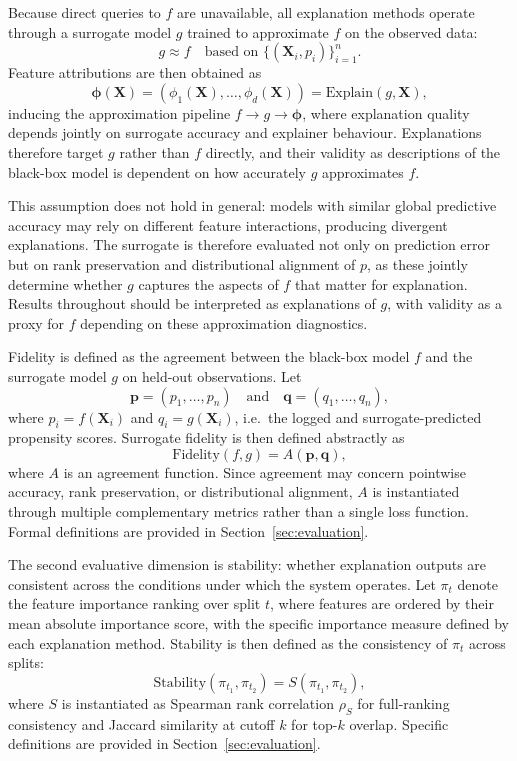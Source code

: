 \documentclass[oneside]{memoir} %
\begin{document}
Because direct queries to $f$ are unavailable, all explanation methods operate through a surrogate model $g$ trained to approximate $f$ on the observed data:
\[
g \approx f \quad \text{based on } \{(\mathbf{X}_i, p_i)\}_{i=1}^n.
\]
Feature attributions are then obtained as
\[
\boldsymbol{\phi}(\mathbf{X}) = (\phi_1(\mathbf{X}), \ldots, \phi_d(\mathbf{X})) =
\text{Explain}(g, \mathbf{X}),
\]
inducing the approximation pipeline $f \rightarrow g \rightarrow \boldsymbol{\phi}$, where explanation quality depends jointly on surrogate accuracy and explainer behaviour. Explanations therefore target $g$ rather than $f$ directly, and their validity as descriptions of the black-box model is dependent on how accurately $g$ approximates $f$.

This assumption does not hold in general: models with similar global predictive accuracy may rely on different feature interactions, producing divergent explanations. The surrogate is therefore evaluated not only on prediction error but on rank preservation and distributional alignment of $p$, as these jointly determine whether $g$ captures the aspects of $f$ that matter for explanation. Results throughout should be interpreted as explanations of $g$, with validity as a proxy for $f$ depending on these approximation diagnostics.

Fidelity is defined as the agreement between the black-box model $f$ and the surrogate model $g$ on held-out observations. Let
\[
\mathbf{p} = (p_1, \ldots, p_n)
\quad \text{and} \quad
\mathbf{q} = (q_1, \ldots, q_n),
\]
where $p_i = f(\mathbf{X}_i)$ and $q_i = g(\mathbf{X}_i)$, i.e.\ the logged and surrogate-predicted propensity scores. Surrogate fidelity is then defined abstractly as
\[
\text{Fidelity}(f,g) = A(\mathbf{p}, \mathbf{q}),
\]
where $A$ is an agreement function. Since agreement may concern pointwise accuracy, rank preservation, or distributional alignment, $A$ is instantiated through multiple complementary metrics rather than a single loss function. Formal definitions are provided in Section~\ref{sec:evaluation}.

The second evaluative dimension is stability: whether explanation outputs are consistent across the conditions under which the system operates. Let $\pi_t$ denote the feature importance ranking over split $t$, where features are ordered by their mean absolute importance score, with the specific importance measure defined by each explanation method. Stability is then defined as the consistency of $\pi_t$ across splits:
\[
\text{Stability}(\pi_{t_1}, \pi_{t_2}) = S(\pi_{t_1}, \pi_{t_2}),
\]
where $S$ is instantiated as Spearman rank correlation $\rho_S$ for full-ranking consistency and Jaccard similarity at cutoff $k$ for top-$k$ overlap. Specific definitions are provided in Section~\ref{sec:evaluation}.
\end{document}
